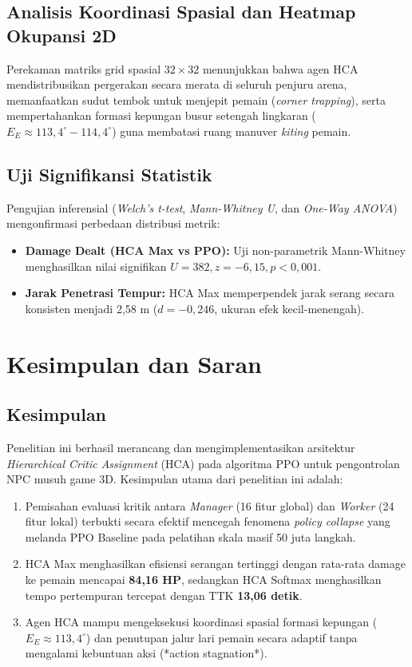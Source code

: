 \documentclass[conference]{IEEEtran}
\begin{document}
\subsection{Analisis Koordinasi Spasial dan Heatmap Okupansi 2D}
Perekaman matriks grid spasial $32 \times 32$ menunjukkan bahwa agen HCA mendistribusikan pergerakan secara merata di seluruh penjuru arena, memanfaatkan sudut tembok untuk menjepit pemain (\textit{corner trapping}), serta mempertahankan formasi kepungan busur setengah lingkaran (\(E_E \approx 113,4^\circ - 114,4^\circ\)) guna membatasi ruang manuver \textit{kiting} pemain.

\subsection{Uji Signifikansi Statistik}
Pengujian inferensial (\textit{Welch's t-test}, \textit{Mann-Whitney U}, dan \textit{One-Way ANOVA}) mengonfirmasi perbedaan distribusi metrik:
\begin{itemize}
    \item \textbf{Damage Dealt (HCA Max vs PPO):} Uji non-parametrik Mann-Whitney menghasilkan nilai signifikan \(U = 382, z = -6,15, p < 0,001\).
    \item \textbf{Jarak Penetrasi Tempur:} HCA Max memperpendek jarak serang secara konsisten menjadi 2,58 m (\(d = -0,246\), ukuran efek kecil-menengah).
\end{itemize}

\section{Kesimpulan dan Saran}

\subsection{Kesimpulan}
Penelitian ini berhasil merancang dan mengimplementasikan arsitektur \textit{Hierarchical Critic Assignment} (HCA) pada algoritma PPO untuk pengontrolan NPC musuh game 3D. Kesimpulan utama dari penelitian ini adalah:
\begin{enumerate}
    \item Pemisahan evaluasi kritik antara \textit{Manager} (16 fitur global) dan \textit{Worker} (24 fitur lokal) terbukti secara efektif mencegah fenomena \textit{policy collapse} yang melanda PPO Baseline pada pelatihan skala masif 50 juta langkah.
    \item HCA Max menghasilkan efisiensi serangan tertinggi dengan rata-rata damage ke pemain mencapai \textbf{84,16 HP}, sedangkan HCA Softmax menghasilkan tempo pertempuran tercepat dengan TTK \textbf{13,06 detik}.
    \item Agen HCA mampu mengeksekusi koordinasi spasial formasi kepungan (\(E_E \approx 113,4^\circ\)) dan penutupan jalur lari pemain secara adaptif tanpa mengalami kebuntuan aksi (*action stagnation*).
\end{enumerate}
\end{document}
